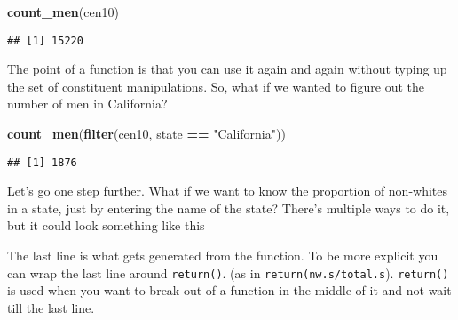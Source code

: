 \documentclass[]{book}
\newenvironment{Shaded}{\begin{snugshade}}{\end{snugshade}}
\newcommand{\KeywordTok}[1]{\textcolor[rgb]{0.13,0.29,0.53}{\textbf{#1}}}
\newcommand{\StringTok}[1]{\textcolor[rgb]{0.31,0.60,0.02}{#1}}
\newcommand{\ControlFlowTok}[1]{\textcolor[rgb]{0.13,0.29,0.53}{\textbf{#1}}}
\newcommand{\OperatorTok}[1]{\textcolor[rgb]{0.81,0.36,0.00}{\textbf{#1}}}
\newcommand{\NormalTok}[1]{#1}
\theoremstyle{definition}
\theoremstyle{definition}
\theoremstyle{definition}
\theoremstyle{remark}
\begin{document}
\begin{Shaded}
\begin{Highlighting}[]
\KeywordTok{count_men}\NormalTok{(cen10)}
\end{Highlighting}
\end{Shaded}

\begin{verbatim}
## [1] 15220
\end{verbatim}

The point of a function is that you can use it again and again without
typing up the set of constituent manipulations. So, what if we wanted to
figure out the number of men in California?

\begin{Shaded}
\begin{Highlighting}[]
\KeywordTok{count_men}\NormalTok{(}\KeywordTok{filter}\NormalTok{(cen10, state }\OperatorTok{==}\StringTok{ "California"}\NormalTok{))}
\end{Highlighting}
\end{Shaded}

\begin{verbatim}
## [1] 1876
\end{verbatim}

Let's go one step further. What if we want to know the proportion of
non-whites in a state, just by entering the name of the state? There's
multiple ways to do it, but it could look something like this

\begin{Shaded}
\end{Shaded}

The last line is what gets generated from the function. To be more
explicit you can wrap the last line around \texttt{return()}. (as in
\texttt{return(nw.s/total.s}). \texttt{return()} is used when you want
to break out of a function in the middle of it and not wait till the
last line.
\end{document}
